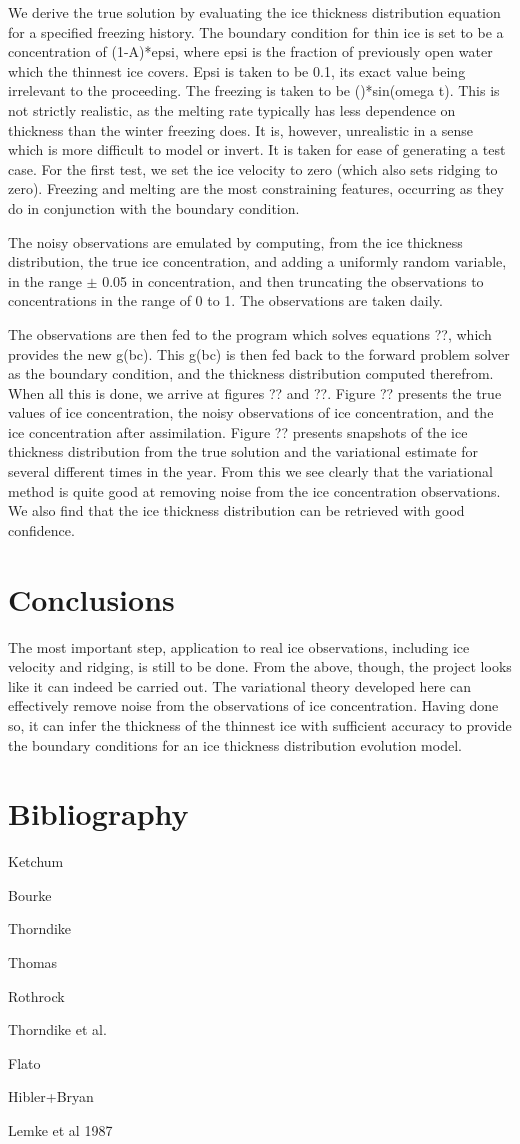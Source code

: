     We derive the true solution by evaluating the ice thickness distribution
equation for a specified freezing history.  The boundary condition for thin
ice is set to be a concentration of (1-A)*epsi, where epsi is the fraction
of previously open water which the thinnest ice covers.  Epsi is taken to be
0.1, its exact value being irrelevant to the proceeding.  The freezing is
taken to be ()*sin(omega t).  This is not strictly realistic, as the melting
rate typically has less dependence on thickness than the winter freezing does.
It is, however, unrealistic in a sense which is more difficult to model
or invert.  It is taken for ease of generating a test case.  For the first
test, we set the ice velocity to zero (which also sets ridging to zero).  
Freezing and melting are the most constraining features, occurring as they
do in conjunction with the boundary condition.  

    The noisy observations are emulated by computing, from the ice thickness
distribution, the true ice concentration, and adding a uniformly random
variable, in the range $\pm$ 0.05 in concentration, and then truncating the
observations to concentrations in the range of 0 to 1.  The observations
are taken daily.

    The observations are then fed to the program which solves equations ??,
which provides the new g(bc).  This g(bc) is then fed back to the
forward problem solver as the boundary condition, and the thickness 
distribution computed therefrom.  When all this is done, we arrive at
figures ?? and ??.  Figure ?? presents the true values of ice concentration,
the noisy observations of ice concentration, and the ice concentration after
assimilation.  Figure ?? presents snapshots of the ice thickness distribution
from the true solution and the variational estimate for several different
times in the year.  From this we see clearly that the variational method
is quite good at removing noise from the ice concentration observations.
We also find that the ice thickness distribution can be retrieved with 
good confidence.
\section{Conclusions}

    The most important step, application to real ice observations, including
ice velocity and ridging, is still to be done.  From the above, though,
the project looks like it can indeed be carried out.  The variational
theory developed here can effectively remove noise from the observations
of ice concentration.  Having done so, it can infer the thickness of
the thinnest ice with sufficient accuracy to provide the boundary 
conditions for an ice thickness distribution evolution model.  
\section{Bibliography}
Ketchum

Bourke

Thorndike

Thomas

Rothrock

Thorndike et al.

Flato

Hibler+Bryan

Lemke et al 1987


